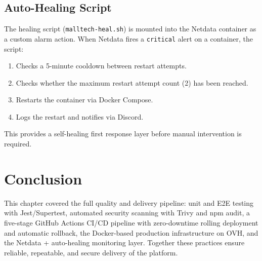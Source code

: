 \subsection{Auto-Healing Script}

The healing script (\texttt{malltech-heal.sh}) is mounted into the Netdata container
as a custom alarm action. When Netdata fires a \texttt{critical} alert on a container,
the script:

\begin{enumerate}
    \item Checks a 5-minute cooldown between restart attempts.
    \item Checks whether the maximum restart attempt count (2) has been reached.
    \item Restarts the container via Docker Compose.
    \item Logs the restart and notifies via Discord.
\end{enumerate}

This provides a self-healing first response layer before manual intervention is required.


\section*{Conclusion}
This chapter covered the full quality and delivery pipeline: unit and E2E testing
with Jest/Supertest, automated security scanning with Trivy and npm audit, a
five-stage GitHub Actions CI/CD pipeline with zero-downtime rolling deployment and
automatic rollback, the Docker-based production infrastructure on OVH, and the
Netdata + auto-healing monitoring layer. Together these practices ensure reliable,
repeatable, and secure delivery of the platform.
